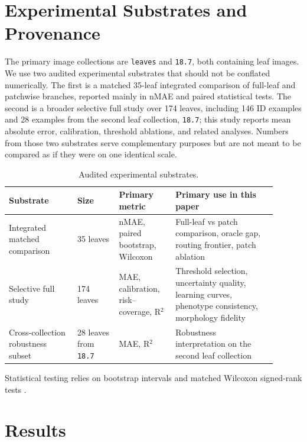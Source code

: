 \documentclass[11pt,a4paper]{article}
\newcommand{\nmae}{nMAE}
\begin{document}
\section{Experimental Substrates and Provenance}
The primary image collections are \texttt{leaves} and \texttt{18.7}, both containing leaf images.
We use two audited experimental substrates that should not be conflated numerically.
The first is a matched 35-leaf integrated comparison of full-leaf and patchwise branches, reported mainly in \nmae{} and paired statistical tests.
The second is a broader selective full study over 174 leaves, including 146 ID examples and 28 examples from the second leaf collection, \texttt{18.7}; this study reports mean absolute error, calibration, threshold ablations, and related analyses.
Numbers from those two substrates serve complementary purposes but are not meant to be compared as if they were on one identical scale.

\begin{table}[H]
\centering
\caption{Audited experimental substrates.}
\label{tab:substrates}
\small
\begin{tabular}{p{0.23\linewidth}p{0.14\linewidth}p{0.19\linewidth}p{0.34\linewidth}}
\toprule
Substrate & Size & Primary metric & Primary use in this paper \\
\midrule
Integrated matched comparison & 35 leaves & \nmae{}, paired bootstrap, Wilcoxon & Full-leaf vs patch comparison, oracle gap, routing frontier, patch ablation \\
Selective full study & 174 leaves & MAE, calibration, risk--coverage, R$^2$ & Threshold selection, uncertainty quality, learning curves, phenotype consistency, morphology fidelity \\
Cross-collection robustness subset & 28 leaves from \texttt{18.7} & MAE, R$^2$ & Robustness interpretation on the second leaf collection \\
\bottomrule
\end{tabular}
\end{table}

Statistical testing relies on bootstrap intervals and matched Wilcoxon signed-rank tests \citep{B_efron1979,B_wilcoxon1945}.

\section{Results}
\end{document}
